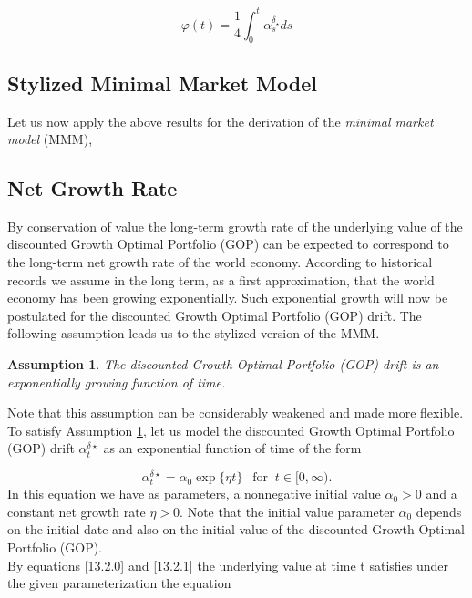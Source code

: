 \documentclass[a4 paper, 12pt]{report}
\theoremstyle{plain}
\newtheorem{assumption}[theorem]{\textbf{Assumption}}
\begin{document}
\begin{equation}\label{13.2.0}
\varphi(t) = \frac{1}{4}\int_0^t\alpha_s^{\delta_\star}ds
\end{equation}
\subsection*{Stylized Minimal Market Model}
Let us now apply the above results for the derivation of the \emph{minimal market model} (MMM),
\subsection{Net Growth Rate}
By conservation of value the long-term growth rate of the underlying value of the discounted Growth Optimal Portfolio (GOP) can be expected
to correspond to the long-term net growth rate of the world economy. According to historical records we assume in
the long term, as a first approximation, that the world economy has been growing exponentially. Such exponential
growth will now be postulated for the discounted Growth Optimal Portfolio (GOP) drift. The following assumption leads us to the stylized
version of the MMM.\\
\begin{assumption}\cite[pg.~8]{guo2011small}\label{assumption421}
The discounted Growth Optimal Portfolio (GOP) drift is an exponentially growing function of time.
\end{assumption}

Note that this assumption can be considerably weakened and made more flexible.
To satisfy Assumption \ref{assumption421}, let us model the discounted Growth Optimal Portfolio (GOP) drift $\alpha_t^{\delta\star}$ as an exponential function of time of the
form

\begin{equation}\label{13.2.1}
\alpha_t^{\delta\star} = \alpha_0\exp\{\eta t\}~~\mbox{  for  }~t\in[0,\infty).
\end{equation}
In this equation we have as parameters, a nonnegative initial value $\alpha_0>0$ and a constant net growth rate $\eta>0$. Note
that the initial value parameter $\alpha_0$ depends on the initial date and also on the initial value of the discounted Growth Optimal Portfolio (GOP).\\
By equations \eqref{13.2.0} and \eqref{13.2.1} the underlying value at time t satisfies under the given parameterization the equation
\end{document}
